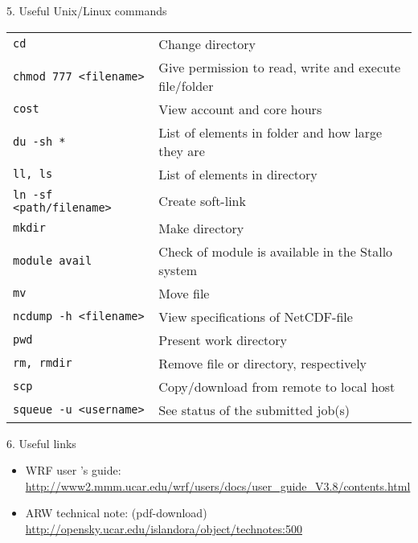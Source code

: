 \documentclass[xcolor=table]{beamer}
\begin{document}
\begin{frame}[fragile]{5. Useful Unix/Linux commands}
\begin{tabular}{p{4.5 cm} p{7	 cm}}
	\texttt{cd}										 & Change directory \\
	\texttt{chmod 777 <filename>} 	& Give permission to read, write and execute file/folder	\\
	\texttt{cost} 				  					& View account and core hours 											  \\
	\texttt{du -sh *} 								& List of elements in folder and how large they are \\
	\texttt{ll, ls}										& List of elements in directory \\
	\texttt{ln -sf <path/filename>}		& Create soft-link \\
	\texttt{mkdir}									& Make directory	\\
	\texttt{module avail}					  &  Check of module is available in the Stallo system 			\\	
	\texttt{mv}										& Move file		\\
	\texttt{ncdump -h <filename>}	& View specifications of NetCDF-file 	\\
	\texttt{pwd}									& Present work directory \\
	\texttt{rm, rmdir}							& Remove file or directory, respectively \\
	\texttt{scp}									 & Copy/download from remote to local host \\
	\texttt{squeue -u <username>}	& See status of the submitted job(s)
\end{tabular}
\end{frame}



\begin{frame}{6. Useful links}
\begin{itemize}
	\item WRF user 's guide:\\
	\url{http://www2.mmm.ucar.edu/wrf/users/docs/user_guide_V3.8/contents.html}\\
	\item ARW technical note: (pdf-download)\\
	\url{http://opensky.ucar.edu/islandora/object/technotes:500}
\end{itemize}
\end{frame}
\end{document}
